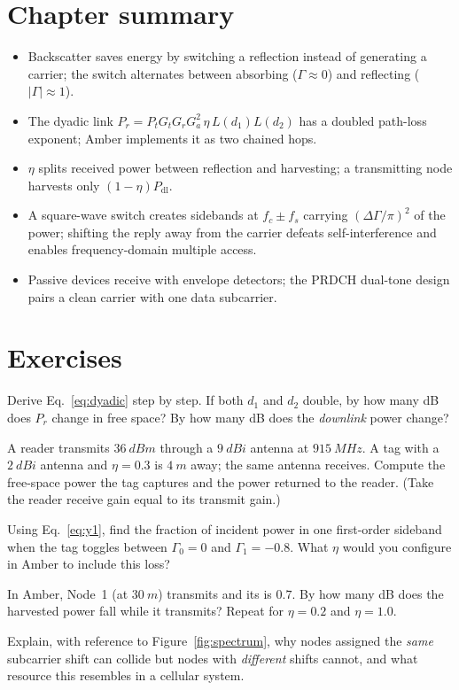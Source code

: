 \section{Chapter summary}
\begin{itemize}
 \item Backscatter saves energy by switching a reflection instead of generating a carrier; the switch alternates between absorbing ($\Gamma\approx0$) and reflecting ($|\Gamma|\approx1$).
 \item The dyadic link $P_r=P_tG_tG_rG_a^2\,\eta\,L(d_1)L(d_2)$ has a doubled path-loss exponent; Amber implements it as two chained hops.
 \item $\eta$ splits received power between reflection and harvesting; a transmitting node harvests only $(1-\eta)P_{\mathrm{dl}}$.
 \item A square-wave switch creates sidebands at $f_c\pm f_s$ carrying $(\Delta\Gamma/\pi)^2$ of the power; shifting the reply away from the carrier defeats self-interference and enables frequency-domain multiple access.
 \item Passive devices receive with envelope detectors; the PRDCH dual-tone design pairs a clean carrier with one data subcarrier.
\end{itemize}

\section*{Exercises}
\begin{exercise}
Derive Eq.~\eqref{eq:dyadic} step by step. If both $d_1$ and $d_2$ double, by how many dB does $P_r$ change in free space? By how many dB does the \emph{downlink} power change?
\end{exercise}
\begin{exercise}
A reader transmits $\SI{36}{dBm}$ through a $\SI{9}{dBi}$ antenna at $\SI{915}{MHz}$. A tag with a $\SI{2}{dBi}$ antenna and $\eta=0.3$ is $\SI{4}{m}$ away; the same antenna receives. Compute the free-space power the tag captures and the power returned to the reader. (Take the reader receive gain equal to its transmit gain.)
\end{exercise}
\begin{exercise}
Using Eq.~\eqref{eq:y1}, find the fraction of incident power in one first-order sideband when the tag toggles between $\Gamma_0=0$ and $\Gamma_1=-0.8$. What $\eta$ would you configure in Amber to include this loss?
\end{exercise}
\begin{exercise}
In Amber, Node~1 (at $\SI{30}{m}$) transmits and its  is $0.7$. By how many dB does the harvested power fall while it transmits? Repeat for $\eta=0.2$ and $\eta=1.0$.
\end{exercise}
\begin{exercise}
Explain, with reference to Figure~\ref{fig:spectrum}, why nodes assigned the \emph{same} subcarrier shift can collide but nodes with \emph{different} shifts cannot, and what resource this resembles in a cellular system.
\end{exercise}

